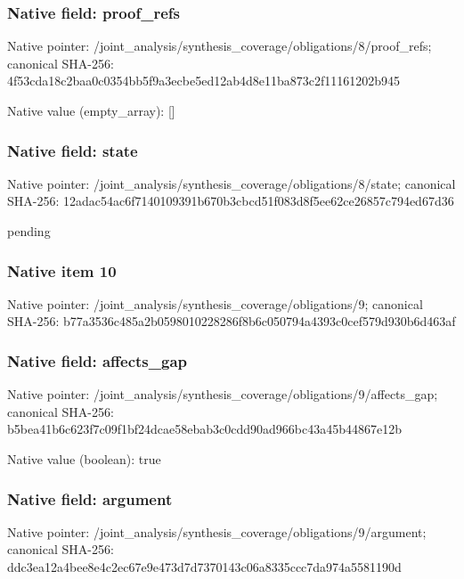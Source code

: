 \documentclass[10pt,a4paper]{article}
\begin{document}
\subsubsection{Native field: proof\_\allowbreak{}refs}
Native pointer: /joint\_\allowbreak{}analysis/synthesis\_\allowbreak{}coverage/obligations/8/proof\_\allowbreak{}refs; canonical SHA-256: 4f53cda18c2baa0c0354bb5f9a3ecbe5ed12ab4d8e11ba873c2f11161202b945

Native value (empty\_\allowbreak{}array): []

\subsubsection{Native field: state}
Native pointer: /joint\_\allowbreak{}analysis/synthesis\_\allowbreak{}coverage/obligations/8/state; canonical SHA-256: 12adac54ac6f7140109391b670b3cbcd51f083d8f5ee62ce26857c794ed67d36

\begingroup\raggedright\sloppy pending\par\endgroup

\subsubsection{Native item 10}
Native pointer: /joint\_\allowbreak{}analysis/synthesis\_\allowbreak{}coverage/obligations/9; canonical SHA-256: b77a3536c485a2b0598010228286f8b6c050794a4393c0cef579d930b6d463af

\subsubsection{Native field: affects\_\allowbreak{}gap}
Native pointer: /joint\_\allowbreak{}analysis/synthesis\_\allowbreak{}coverage/obligations/9/affects\_\allowbreak{}gap; canonical SHA-256: b5bea41b6c623f7c09f1bf24dcae58ebab3c0cdd90ad966bc43a45b44867e12b

Native value (boolean): true

\subsubsection{Native field: argument}
Native pointer: /joint\_\allowbreak{}analysis/synthesis\_\allowbreak{}coverage/obligations/9/argument; canonical SHA-256: ddc3ea12a4bee8e4c2ec67e9e473d7d7370143c06a8335ccc7da974a5581190d
\end{document}
